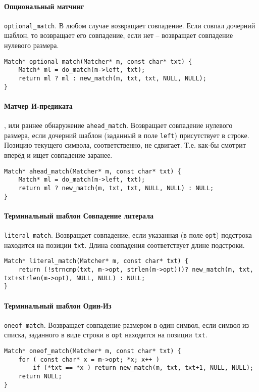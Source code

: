 \documentclass[10pt]{report}
\begin{document}
\paragraph{Опциональный матчинг} {\tt optional\_match}. В любом случае возвращает совпадение. Если совпал дочерний шаблон, то возвращает его совпадение, если нет -- возвращает совпадение нулевого размера.
\begin{lstlisting}[firstnumber=93]
Match* optional_match(Matcher* m, const char* txt) {
	Match* ml = do_match(m->left, txt);
	return ml ? ml : new_match(m, txt, txt, NULL, NULL);
}
\end{lstlisting}
\paragraph{Матчер И-предиката}, или раннее обнаружение {\tt ahead\_match}. Возвращает совпадение нулевого размера, если дочерний шаблон (заданный в поле {\tt left}) присутствует в строке. Позицию текущего символа, соответственно, не сдвигает.
Т.е. как-бы смотрит вперёд и ищет совпадение заранее.
\begin{lstlisting}[firstnumber=108]
Match* ahead_match(Matcher* m, const char* txt) {
	Match* ml = do_match(m->left, txt);
	return ml ? new_match(m, txt, txt, NULL, NULL) : NULL;
}
\end{lstlisting}

\paragraph{Терминальный шаблон Совпадение литерала} {\tt literal\_match}. Возвращает совпадение, если указанная (в поле {\tt opt}) подстрока находится на позиции {\tt txt}. Длина совпадения соответствует длине подстроки.
\begin{lstlisting}[firstnumber=98]
Match* literal_match(Matcher* m, const char* txt) {
	return (!strncmp(txt, m->opt, strlen(m->opt)))? new_match(m, txt, txt+strlen(m->opt), NULL, NULL) : NULL;
}
\end{lstlisting}
\paragraph{Терминальный шаблон Один-Из} {\tt oneof\_match}. Возвращает совпадение размером в один символ, если символ из списка, заданного в виде строки в {\tt opt}  находится на позиции {\tt txt}. 
\begin{lstlisting}[firstnumber=102]
Match* oneof_match(Matcher* m, const char* txt) {
	for ( const char* x = m->opt; *x; x++ ) 
		if (*txt == *x ) return new_match(m, txt, txt+1, NULL, NULL);
	return NULL;
}
\end{lstlisting}
\end{document}
